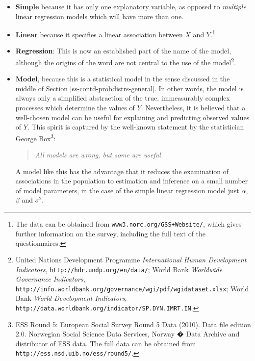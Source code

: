 \documentclass[11pt,a4paper,openany]{book}
\let\rmarkdownfootnote\footnote%
\def\footnote{\protect\rmarkdownfootnote}
\begin{document}
\begin{itemize}
\item
  \textbf{Simple} because it has only one explanatory variable, as
  opposed to \emph{multiple} linear regression models which will have
  more than one.
\item
  \textbf{Linear} because it specifies a linear association between
  \(X\) and \(Y\).\footnote{The data can be obtained from
    \texttt{www3.norc.org/GSS+Website/}, which gives further information
    on the survey, including the full text of the questionnaires.}
\item
  \textbf{Regression}: This is now an established part of the name of
  the model, although the origins of the word are not central to the use
  of the model\footnote{United Nations Development Programme
    \emph{International Human Development Indicators},
    \texttt{http://hdr.undp.org/en/data/}; World Bank \emph{Worldwide
    Governance Indicators},
    \texttt{http://info.worldbank.org/governance/wgi/pdf/wgidataset.xlsx};
    World Bank \emph{World Development Indicators},
    \texttt{http://data.worldbank.org/indicator/SP.DYN.IMRT.IN}.}.
\item
  \textbf{Model}, because this is a statistical model in the sense
  discussed in the middle of Section \ref{ss-contd-probdistrs-general}.
  In other words, the model is always only a simplified abstraction of
  the true, immeasurably complex processes which determine the values of
  \(Y\). Nevertheless, it is believed that a well-chosen model can be
  useful for explaining and predicting observed values of \(Y\). This
  spirit is captured by the well-known statement by the statistician
  George Box\footnote{ESS Round 5: European Social Survey Round 5 Data
    (2010). Data file edition 2.0. Norwegian Social Science Data
    Services, Norway � Data Archive and distributor of ESS data. The
    full data can be obtained from
    \texttt{http://ess.nsd.uib.no/ess/round5/}.}:

  \begin{quote}
  \emph{All models are wrong, but some are useful.}
  \end{quote}

  A model like this has the advantage that it reduces the examination of
  associations in the population to estimation and inference on a small
  number of model parameters, in the case of the simple linear
  regression model just \(\alpha\), \(\beta\) and \(\sigma^{2}\).
\end{itemize}
\end{document}
